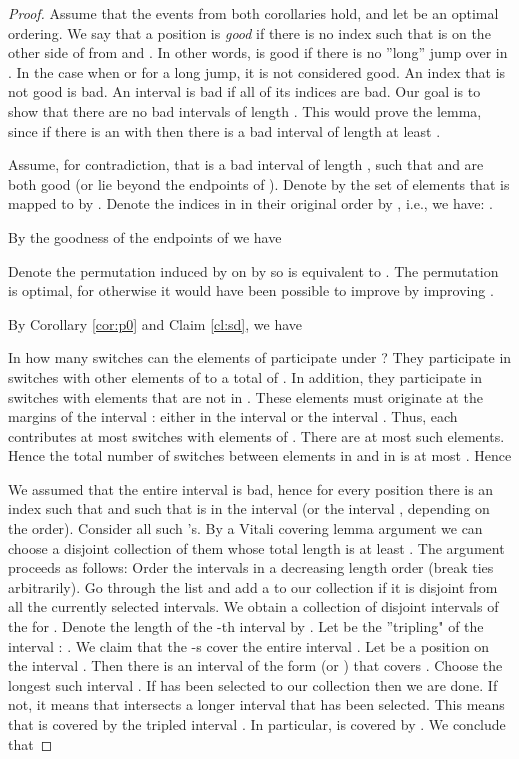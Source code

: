 \documentclass[11pt]{article}
\begin{document}
\begin{proof}
Assume that the events from both corollaries hold, and let  be an optimal
ordering.  We say that a position  is {\em good} if 
there is no index  such that  is on the other side of  from  and 
. In other words,  is good if there is 
no ''long'' jump over  in . 
In the case when  or  for a long
jump, it is not considered good. An index that is not good is bad. 
An interval  is 
bad if all of its indices are bad. Our goal is to show that there are no bad intervals of length . 
This would prove the lemma, since if there is an  with 
 then there is a bad interval of length at least 
.

Assume, for contradiction, that  is a bad interval 
of length , such that  and  are both good (or lie
beyond the endpoints of ). Denote by  the set of elements 
that is mapped to  by . Denote the  indices in  in their original 
order by , i.e., we have: 
. 

By the goodness of the endpoints of  we have
 
Denote the permutation induced by  on  by  so 
 is equivalent to .
 The permutation 
 is optimal, for otherwise it would have been possible to improve 
by improving .

By Corollary \ref{cor:p0} and Claim \ref{cl:sd}, we have 

In how many switches can
the elements of  participate under ? They participate in switches with other
elements of  to a total of . In addition, they participate in switches
with elements that are not in . These elements must originate at the margins of the 
interval : either in the interval  or the interval .
Thus, each contributes at most  switches with elements of . There are at most  
such elements. Hence the total number of switches between elements in  and in  is at most
. Hence


We assumed that the entire interval  is bad, hence for every position  there is 
an index  such that  and such that  is in the interval
 (or the interval , depending on the order). 
Consider all such 's. By a Vitali covering lemma argument we can 
choose a disjoint collection of them   whose total length is at 
least . The argument proceeds as follows: Order the intervals  
in a decreasing length order (break ties arbitrarily). Go through the list and 
add a  to our collection if it is disjoint from all the currently selected intervals.
We obtain a collection  of disjoint intervals of the for . 
Denote the length of the -th interval by . 
Let  be the ''tripling" of the interval : . 
We claim that the -s cover the entire interval . Let  be a position on the interval 
. Then there is an interval of the form  (or ) that covers
. Choose the longest such interval . If  has been selected to 
our collection then we are done. If not, it means that  intersects a longer interval 
 that has been selected. This means that  is covered by the tripled interval . 
In particular,  is covered by . We conclude that 


\end{proof}
\end{document}
